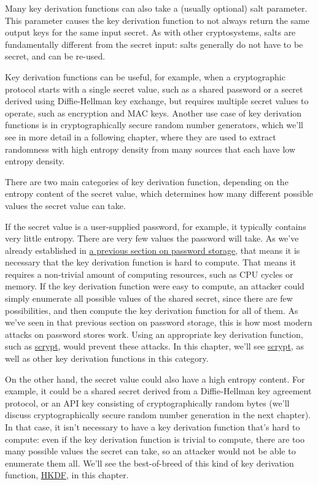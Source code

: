 \documentclass[11pt,ebook,table,dvipsnames]{memoir}
\begin{document}
Many key derivation functions can also take a (usually optional)
\gls{salt} parameter. This parameter causes the key derivation
function to not always return the same output keys for the same input
secret. As with other cryptosystems, salts are fundamentally different
from the secret input: salts generally do not have to be secret, and
can be re-used.

Key derivation functions can be useful, for example, when a
cryptographic protocol starts with a single secret value, such as a
shared password or a secret derived using Diffie-Hellman key exchange,
but requires multiple secret values to operate, such as encryption and
MAC keys. Another use case of key derivation functions is in
cryptographically secure random number generators, which we'll see in
more detail in a following chapter, where they are used to extract
randomness with high entropy density from many sources that each have
low entropy density.

There are two main categories of key derivation function, depending on
the entropy content of the secret value, which determines how many
different possible values the secret value can take.

If the secret value is a user-supplied password, for example, it
typically contains very little entropy. There are very few values the
password will take. As we've already established in \hyperref[password-storage]{a previous section
on password storage}, that means it is necessary that the key
derivation function is hard to compute. That means it requires a
non-trivial amount of computing resources, such as CPU cycles or
memory. If the key derivation function were easy to compute, an
attacker could simply enumerate all possible values of the shared
secret, since there are few possibilities, and then compute the key
derivation function for all of them. As we've seen in that previous
section on password storage, this is how most modern attacks on
password stores work. Using an appropriate key derivation function,
such as \hyperref[scrypt]{scrypt}, would prevent these attacks. In this chapter, we'll
see \hyperref[scrypt]{scrypt}, as well as other key derivation functions in this
category.

On the other hand, the secret value could also have a high entropy
content. For example, it could be a shared secret derived from a
Diffie-Hellman key agreement protocol, or an API key consisting of
cryptographically random bytes (we'll discuss cryptographically secure
random number generation in the next chapter). In that case, it isn't
necessary to have a key derivation function that's hard to compute:
even if the key derivation function is trivial to compute, there are
too many possible values the secret can take, so an attacker would not
be able to enumerate them all. We'll see the best-of-breed of this
kind of key derivation function, \hyperref[HKDF]{HKDF}, in this chapter.
\end{document}
